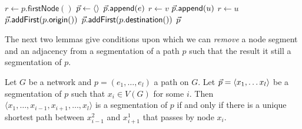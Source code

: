 \begin{algorithm}[t]
\small
\caption{$\textsf{min-seg}\left( G, p = (e_1, \ldots e_l) \right)$}
\begin{algorithmic}[1]
\STATE $r \gets p.\textsf{firstNode}()$
\STATE $\vec{p} \gets \langle \rangle$
 \label{line:min-seg-for}
   \label{line:min-seg-if1}
      \STATE $\vec{p}.\textsf{append}(e)$ \label{line:min-seg-add2}
      \STATE $r \gets v$ \label{line:min-seg-r2}
    \ELSE
      \STATE $\vec{p}.\textsf{append}(u)$ \label{line:min-seg-add1}
      \STATE $r \gets u$ \label{line:min-seg-r1}
    \ENDIF
  \ENDIF
\ENDFOR
{}
  \STATE $\vec{p}.\textsf{addFirst}(p.\textsf{origin}())$  \label{line:min-seg-add3}
\ENDIF
{}
  \STATE $\vec{p}.\textsf{addFirst}(p.\textsf{destination}())$ \label{line:min-seg-add4}
\ENDIF
\RETURN $\vec{p}$
\end{algorithmic}
\label{algo:minseg}
\end{algorithm}

The next two lemmas give conditions upon which we can \emph{remove} a node segment and an adjacency from a segmentation of a path $p$
such that the result it still a segmentation of $p$.

\begin{lemma}
\label{lemma:min-seg-remove-node}
Let $G$ be a network and $p = (e_1, \ldots, e_l)$ a path on $G$. Let $\vec{p} = \langle x_1, \ldots x_l \rangle$ be a segmentation of $p$ such that
$x_i \in V(G)$ for some $i$. Then $\langle x_1, \ldots, x_{i - 1}, x_{i + 1}, \ldots, x_l \rangle$ is a segmentation of $p$
if and only if there is a unique shortest path between $x^2_{i - 1}$ and $x^1_{i + 1}$ that passes by node $x_i$.
\end{lemma}

